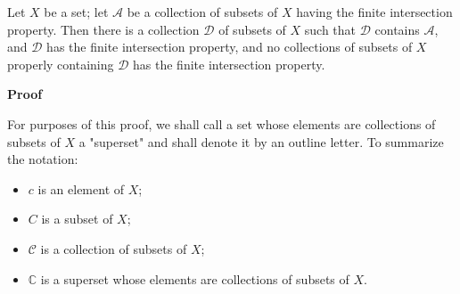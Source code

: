 \documentclass[main.tex]{subfiles}
\begin{document}
\begin{lemma}\label{lemma:maximal}
    Let $X$ be a set; let $\mathcal{A}$ be a collection of subsets of $X$ having the finite intersection property. Then there is a collection $\mathcal{D}$ of subsets of $X$ such that $\mathcal{D}$ contains $\mathcal{A}$, and $\mathcal{D}$ has the finite intersection property, and no collections of subsets of $X$ properly containing $\mathcal{D}$ has the finite intersection property. 
\end{lemma}
\par \noindent \textbf{Proof} 
\par For purposes of this proof, we shall call a set whose elements are collections of subsets of $X$ a "superset" and shall denote it by an outline letter. To summarize the notation: 
\begin{itemize}
    \item $c$ is an element of $X$;
    \item $C$ is a subset of $X$; 
    \item $\mathcal{C}$ is a collection of subsets of $X$; 
    \item $\mathbb{C}$ is a superset whose elements are collections of subsets of $X$. 
\end{itemize} 
\end{document}
